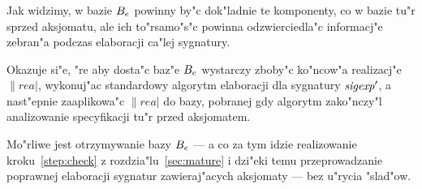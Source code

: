 \subsubsection{\secobservation}
\label{sec:observation}

Jak widzimy, w bazie $B_e$ powinny by"c dok"ladnie te komponenty, 
co w bazie tu"r sprzed aksjomatu, ale ich to"rsamo"s"c powinna
odzwierciedla"c informacj"e zebran"a podczas elaboracji ca"lej sygnatury.

\begin{obs}
\label{thm:make_be}
Okazuje si"e, "re aby dosta"c baz"e $B_e$ wystarczy zboby"c ko"ncow"a realizacj"e $\|rea|$,
wykonuj"ac standardowy algorytm elaboracji dla sygnatury ${\it sigexp}'$,
a nast"epnie zaaplikowa"c $\|rea|$ do bazy, pobranej gdy algorytm
zako"nczy"l analizowanie specyfikacji tu"r przed aksjomatem.
\end{obs}

\begin{cor}
Mo"rliwe jest otrzymywanie bazy $B_e$ --- 
a co za tym idzie realizowanie kroku~\ref{step:check} z rozdzia"lu~\ref{sec:mature}
i dzi"eki temu przeprowadzanie poprawnej elaboracji sygnatur zawieraj"acych aksjomaty
--- bez u"rycia "slad"ow.
\end{cor}




